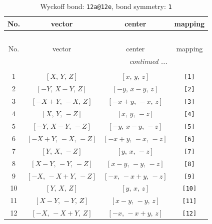 \documentclass[fleqn,8pt]{jsarticle}
\begin{document}
\begin{longtable}{cccc}
\caption{Wyckoff bond: {\tt 12a@12e}, bond symmetry: {\tt 1}}
 \\
 \hline \hline
No. & vector & center & mapping \\ \hline \endfirsthead

\multicolumn{3}{l}{\tablename\ \thetable{}} \\
 \hline \hline
No. & vector & center & mapping \\ \hline \endhead

 \hline \hline
\multicolumn{3}{r}{\footnotesize\it continued ...} \\ \endfoot

 \hline \hline
\multicolumn{3}{r}{} \\ \endlastfoot

1 & $\left[ X,\, Y,\, Z \right]$ & $\left[ x,\, y,\, z \right]$ & {\tt [1]} \\ \hline
2 & $\left[ - Y,\, X - Y,\, Z \right]$ & $\left[ - y,\, x - y,\, z \right]$ & {\tt [2]} \\ \hline
3 & $\left[ - X + Y,\, - X,\, Z \right]$ & $\left[ - x + y,\, - x,\, z \right]$ & {\tt [3]} \\ \hline
4 & $\left[ X,\, Y,\, - Z \right]$ & $\left[ x,\, y,\, - z \right]$ & {\tt [4]} \\ \hline
5 & $\left[ - Y,\, X - Y,\, - Z \right]$ & $\left[ - y,\, x - y,\, - z \right]$ & {\tt [5]} \\ \hline
6 & $\left[ - X + Y,\, - X,\, - Z \right]$ & $\left[ - x + y,\, - x,\, - z \right]$ & {\tt [6]} \\ \hline
7 & $\left[ Y,\, X,\, - Z \right]$ & $\left[ y,\, x,\, - z \right]$ & {\tt [7]} \\ \hline
8 & $\left[ X - Y,\, - Y,\, - Z \right]$ & $\left[ x - y,\, - y,\, - z \right]$ & {\tt [8]} \\ \hline
9 & $\left[ - X,\, - X + Y,\, - Z \right]$ & $\left[ - x,\, - x + y,\, - z \right]$ & {\tt [9]} \\ \hline
10 & $\left[ Y,\, X,\, Z \right]$ & $\left[ y,\, x,\, z \right]$ & {\tt [10]} \\ \hline
11 & $\left[ X - Y,\, - Y,\, Z \right]$ & $\left[ x - y,\, - y,\, z \right]$ & {\tt [11]} \\ \hline
12 & $\left[ - X,\, - X + Y,\, Z \right]$ & $\left[ - x,\, - x + y,\, z \right]$ & {\tt [12]} \\
\end{longtable}
\end{document}
